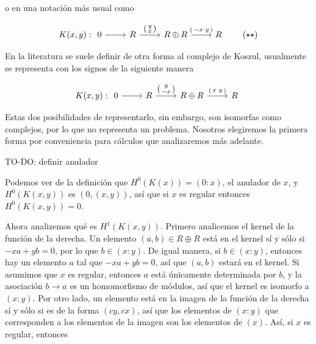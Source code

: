 o en una notación más usual como 

\[
K(x,y):
\begin{tikzcd}[ampersand replacement=\&]
0 \ar[r] \& R \ar{r}{
\left( \begin{smallmatrix} y \\ x \end{smallmatrix} \right)
} \& R \oplus R \ar{r}{
\left( \begin{smallmatrix} -x & y \end{smallmatrix} \right)
} \& R
\end{tikzcd} \label{complex2common} \tag{$\star\star$}
\]

En la literatura se suele definir de otra forma al complejo de Koszul, usualmente se representa con los signos de la siguiente manera

\[
K(x,y):
\begin{tikzcd}[ampersand replacement=\&]
0 \ar[r] \& R \ar{r}{
\left( \begin{smallmatrix} y \\ -x \end{smallmatrix} \right)
} \& R \oplus R \ar{r}{
\left( \begin{smallmatrix} x & y \end{smallmatrix} \right)
} \& R
\end{tikzcd}
\]

Estas dos posibilidades de representarlo, sin embargo, son isomorfas como complejos, por lo que no representa un problema. Nosotros elegiremos la primera forma por conveniencia para cálculos que analizaremos más adelante.

TO-DO: definir anulador

Podemos ver de la definición que $H^0(K(x)) = (0:x)$, el anulador de $x$, y $H^0(K(x,y))$ es $(0, (x,y))$, así que si $x$ es regular entonces $H^0(K(x,y)) = 0$.

Ahora analizemos qué es $H^1(K(x,y))$. Primero analicemos el kernel de la función de la derecha. Un elemento $(a,b) \in R\oplus R$ está en el kernel sí y sólo si $-xa+yb = 0$, por lo que $b \in (x:y)$. De igual manera, si $b \in (x:y)$, entonces hay un elemento $a$ tal que $-xa + yb = 0$, así que $(a,b)$ estará en el kernel. Si asumimos que $x$ es regular, entonces $a$ está únicamente determinada por $b$, y la asociación $b\rightarrow a$ es un homomorfismo de módulos, así que el kernel es isomorfo a $(x:y)$.
Por otro lado, un elemento está en la imagen de la función de la derecha sí y sólo si es de la forma $(cy, cx)$, así que los elementos de $(x:y)$ que corresponden a los elementos de la imagen son los elementos de $(x)$. Así, si $x$ es regular, entonces

